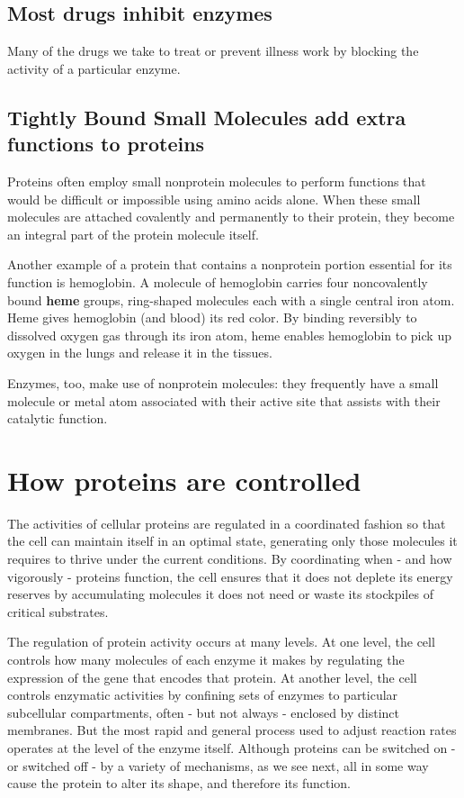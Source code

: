 \subsection{Most drugs inhibit enzymes}

Many of the drugs we take to treat or prevent illness work by blocking
the activity of a particular enzyme.


\subsection{Tightly Bound Small Molecules add extra functions to proteins}

Proteins often employ small nonprotein molecules to perform functions that would be
difficult or impossible using amino acids alone. When these small molecules are attached covalently and permanently
to their protein, they become an integral part of the protein molecule
itself.

Another example of a protein that contains a nonprotein portion essential
for its function is hemoglobin. A molecule of hemoglobin
carries four noncovalently bound \textbf{heme} groups, ring-shaped molecules
each with a single central iron atom. Heme gives hemoglobin (and blood) its red color. 
By binding reversibly to dissolved oxygen gas through its iron atom,
heme enables hemoglobin to pick up oxygen in the lungs and release it in the tissues.

Enzymes, too, make use of nonprotein molecules: they frequently have
a small molecule or metal atom associated with their active site that
assists with their catalytic function.%

\section{How proteins are controlled}

The activities of cellular proteins are regulated in
a coordinated fashion so that the cell can maintain itself in an optimal
state, generating only those molecules it requires to thrive under the current conditions.
By coordinating when - and how vigorously - proteins
function, the cell ensures that it does not deplete its energy reserves by
accumulating molecules it does not need or waste its stockpiles of critical substrates.

The regulation of protein activity occurs at many levels. At one level, the
cell controls how many molecules of each enzyme it makes by regulating
the expression of the gene that encodes that protein.
At another level, the cell controls enzymatic activities by confining sets 
of enzymes to particular subcellular compartments, often - but
not always - enclosed by distinct membranes.
But the most rapid and general process used to adjust reaction
rates operates at the level of the enzyme itself. Although proteins can be
switched on - or switched off - by a variety of mechanisms, as we see
next, all in some way cause the protein to alter its shape, and therefore
its function.

